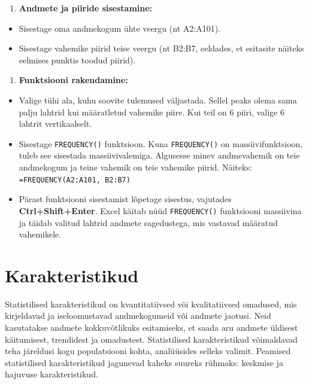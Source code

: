 \documentclass[
]{book}
\providecommand{\tightlist}{%
  \setlength{\itemsep}{0pt}\setlength{\parskip}{0pt}}
\theoremstyle{definition}
\theoremstyle{definition}
\theoremstyle{definition}
\theoremstyle{definition}
\theoremstyle{remark}
\begin{document}
\begin{enumerate}
\def\labelenumi{\arabic{enumi}.}
\tightlist
\item
  \textbf{Andmete ja piiride sisestamine:}
\end{enumerate}

\begin{itemize}
\tightlist
\item
  Sisestage oma andmekogum ühte veergu (nt A2:A101).
\item
  Sisestage vahemike piirid teise veergu (nt B2:B7, eeldades, et esitasite näiteks eelmises punktis toodud piirid).
\end{itemize}

\begin{enumerate}
\def\labelenumi{\arabic{enumi}.}
\setcounter{enumi}{1}
\tightlist
\item
  \textbf{Funktsiooni rakendamine:}
\end{enumerate}

\begin{itemize}
\tightlist
\item
  Valige tühi ala, kuhu soovite tulemused väljastada. Sellel peaks olema sama palju lahtrid kui määratletud vahemike piire. Kui teil on 6 piiri, valige 6 lahtrit vertikaalselt.
\item
  Sisestage \texttt{FREQUENCY()} funktsioon. Kuna \texttt{FREQUENCY()} on massiivifunktsioon, tuleb see sisestada massiivivalemiga. Algusesse minev andmevahemik on teie andmekogum ja teine vahemik on teie vahemike piirid.
  Näiteks: \texttt{=FREQUENCY(A2:A101,\ B2:B7)}
\item
  Pärast funktsiooni sisestamist lõpetage sisestus, vajutades \textbf{Ctrl+Shift+Enter}. Excel käitab nüüd \texttt{FREQUENCY()} funktsiooni massiivina ja täidab valitud lahtrid andmete sagedustega, mis vastavad määratud vahemikele.
\end{itemize}

\chapter{Karakteristikud}\label{karakteristikud}

Statistilised karakteristikud on kvantitatiivsed või kvalitatiivsed omadused, mis kirjeldavad ja iseloomustavad andmekogumeid või andmete jaotusi. Neid kasutatakse andmete kokkuvõtlikuks esitamiseks, et saada aru andmete üldisest käitumisest, trendidest ja omadustest. Statistilised karakteristikud võimaldavad teha järeldusi kogu populatsiooni kohta, analüüsides selleks valimit. Peamised statistilised karakteristikud jagunevad kaheks suureks rühmaks: keskmise ja hajuvuse karakteristikud.
\end{document}
